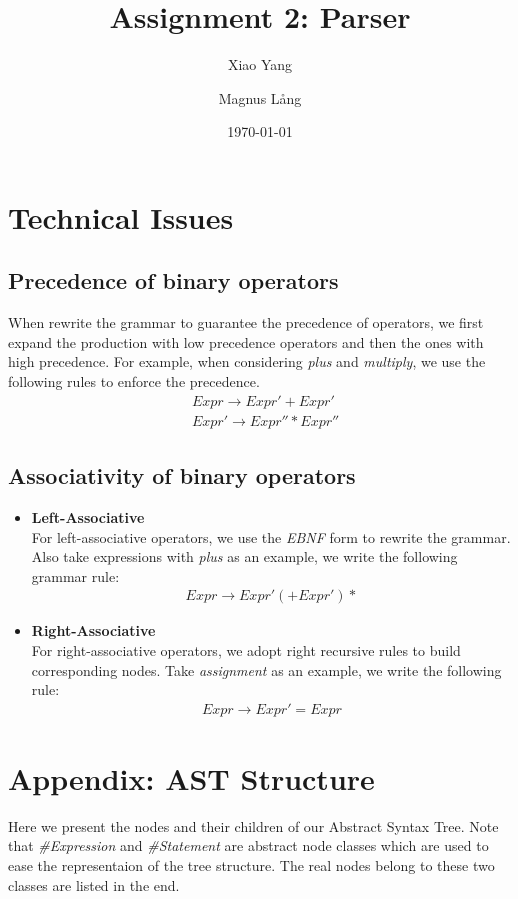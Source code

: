 \documentclass[a4paper,11pt]{article}
\title{Assignment 2: Parser}
\author{Xiao Yang \and Magnus L{\aa}ng} %
\date{\today}
\begin{document}
\maketitle


\section{Technical Issues}
\subsection{Precedence of binary operators}
When rewrite the grammar to guarantee the precedence of operators, we first expand the production with low precedence operators and then the ones with high precedence.
For example, when considering \emph{plus} and \emph{multiply}, we use the following rules to enforce the precedence.
\begin{eqnarray*}
	& Expr \rightarrow Expr' + Expr' \\
	& Expr' \rightarrow Expr'' * Expr''
\end{eqnarray*}

\subsection{Associativity of binary operators}
\begin{itemize}
	\item \textbf{Left-Associative} \\
	For left-associative operators, we use the \emph{EBNF} form to rewrite the grammar.
	Also take expressions with \emph{plus} as an example, we write the following grammar rule:
	\begin{eqnarray*}
		Expr \rightarrow Expr' (+ Expr')*
	\end{eqnarray*}
	
	
	\item \textbf{Right-Associative} \\
	For right-associative operators, we adopt right recursive rules to build corresponding nodes.
	Take \emph{assignment} as an example, we write the following rule:
	\begin{eqnarray*}
		Expr \rightarrow Expr' = Expr
	\end{eqnarray*}
	
\end{itemize}


\newpage

\section{Appendix: AST Structure}
Here we present the nodes and their children of our Abstract Syntax Tree. Note that \emph{\#Expression} and \emph{\#Statement} are abstract node classes which are used to ease the representaion of the tree structure. The real nodes belong to these two classes are listed in the end.
\end{document}
